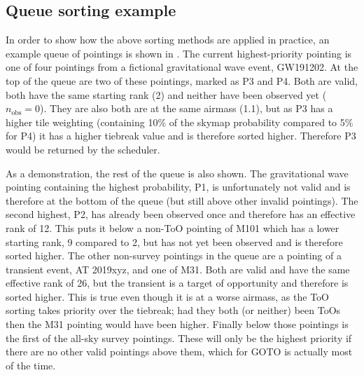 \begin{colsection}
\subsection{Queue sorting example}
\label{sec:sorting_example}
\begin{colsection}

In order to show how the above sorting methods are applied in practice, an example queue of pointings is shown in . The current highest-priority pointing is one of four pointings from a fictional gravitational wave event, GW191202. At the top of the queue are two of these pointings, marked as P3 and P4. Both are valid, both have the same starting rank (2) and neither have been observed yet ($n_\text{obs}=0$). They are also both are at the same airmass (1.1), but as P3 has a higher tile weighting (containing 10\% of the skymap probability compared to 5\% for P4) it has a higher tiebreak value and is therefore sorted higher. Therefore P3 would be returned by the scheduler.

As a demonstration, the rest of the queue is also shown. The gravitational wave pointing containing the highest probability, P1, is unfortunately not valid and is therefore at the bottom of the queue (but still above other invalid pointings). The second highest, P2, has already been observed once and therefore has an effective rank of 12. This puts it below a non-ToO pointing of M101 which has a lower starting rank, 9 compared to 2, but has not yet been observed and is therefore sorted higher. The other non-survey pointings in the queue are a pointing of a transient event, AT 2019xyz, and one of M31. Both are valid and have the same effective rank of 26, but the transient is a target of opportunity and therefore is sorted higher. This is true even though it is at a worse airmass, as the ToO sorting takes priority over the tiebreak; had they both (or neither) been ToOs then the M31 pointing would have been higher. Finally below those pointings is the first of the all-sky survey pointings. These will only be the highest priority if there are no other valid pointings above them, which for GOTO is actually most of the time.


\end{colsection}
\end{colsection}
